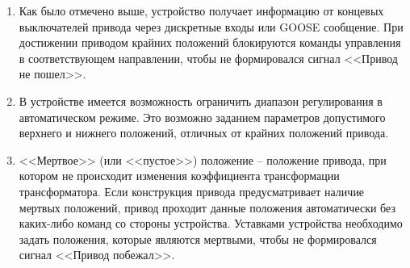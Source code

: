 \begin{enumerate}
\begin{enumerate}
\begin{itemize}
\end{itemize}
\item
Как было отмечено выше, устройство получает информацию от концевых выключателей привода через дискретные входы или GOOSE сообщение. При достижении приводом крайних положений блокируются команды управления в соответствующем направлении, чтобы не формировался сигнал <<Привод не пошел>>.
\item
В устройстве имеется возможность ограничить диапазон регулирования в автоматическом режиме. Это возможно заданием параметров допустимого верхнего и нижнего положений, отличных от крайних положений привода.
\item
<<Мертвое>> (или <<пустое>>) положение -- положение привода, при котором не происходит изменения коэффициента трансформации трансформатора. Если конструкция привода предусматривает наличие мертвых положений, привод проходит данные положения автоматически без каких-либо команд со стороны устройства. Уставками устройства необходимо задать положения, которые являются мертвыми, чтобы не формировался сигнал <<Привод побежал>>.
\end{enumerate}

\end{enumerate}